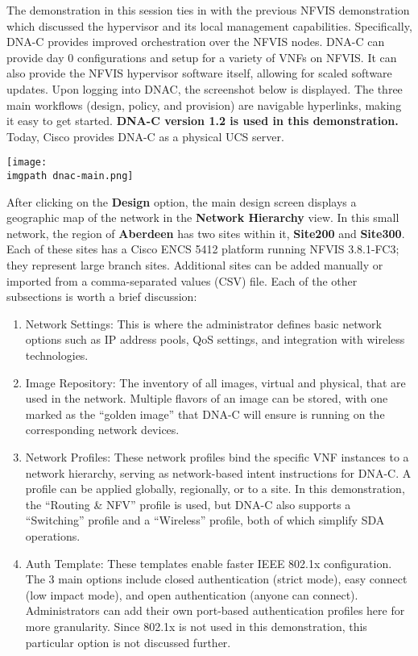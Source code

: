 The demonstration in this session ties in with the previous NFVIS
demonstration which discussed the hypervisor and its local management
capabilities. Specifically, DNA-C provides improved orchestration over the
NFVIS nodes. DNA-C can provide day 0 configurations and setup for a variety of
VNFs on NFVIS. It can also provide the NFVIS hypervisor software itself,
allowing for scaled software updates. Upon logging into DNAC, the screenshot
below is displayed. The three main workflows (design, policy, and provision)
are navigable hyperlinks, making it easy to get started. \textbf{DNA-C version 1.2
is used in this demonstration.} Today, Cisco provides DNA-C as a physical UCS
server.

    \begin{minipage}[t]{\linewidth}
	  \centering
      \texttt{[image: \\imgpath dnac-main.png]}
    \end{minipage}

After clicking on the \textbf{Design} option, the main design screen displays
a geographic map of the network in the \textbf{Network Hierarchy} view. In
this small network, the region of \textbf{Aberdeen} has two sites within it,
\textbf{Site200} and \textbf{Site300}. Each of these sites has a Cisco ENCS
5412 platform running NFVIS 3.8.1-FC3; they represent large branch sites.
Additional sites can be added manually or imported from a comma-separated
values (CSV) file. Each of the other subsections is worth a brief discussion:

\begin{enumerate}
  \item Network Settings: This is where the administrator defines basic
  network options such as IP address pools, QoS settings, and integration with
  wireless technologies.
  \item Image Repository: The inventory of all images, virtual and physical,
  that are used in the network. Multiple flavors of an image can be stored, with
  one marked as the ``golden image'' that DNA-C will ensure is running on the
  corresponding network devices.
  \item Network Profiles: These network profiles bind the specific VNF
  instances to a network hierarchy, serving as network-based intent instructions
  for DNA-C. A profile can be applied globally, regionally, or to a site. In
  this demonstration, the ``Routing \& NFV'' profile is used, but DNA-C also
  supports a ``Switching'' profile and a ``Wireless'' profile, both of which
  simplify SDA operations.
  \item Auth Template: These templates enable faster IEEE 802.1x
  configuration. The 3 main options include closed authentication (strict mode),
  easy connect (low impact mode), and open authentication (anyone can connect).
  Administrators can add their own port-based authentication profiles here for
  more granularity. Since 802.1x is not used in this demonstration, this
  particular option is not discussed further.
\end{enumerate}

